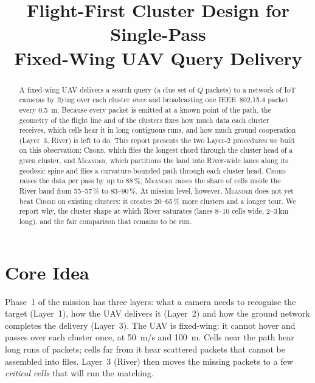 \documentclass[conference]{IEEEtran}
\begin{document}
\title{Flight-First Cluster Design for Single-Pass\\Fixed-Wing UAV Query Delivery}
\author{
}
\maketitle

\begin{abstract}
A fixed-wing UAV delivers a search query (a clue set of $Q$ packets) to a network of IoT cameras by flying over each
cluster \emph{once} and broadcasting one IEEE~802.15.4 packet every \SI{0.5}{m}. Because every packet is emitted at a
known point of the path, the geometry of the flight line and of the clusters fixes how much data each cluster
receives, which cells hear it in long contiguous runs, and how much ground cooperation (Layer~3, River) is left to do.
This report presents the two Layer-2 procedures we built on this observation: \textsc{Chord}, which flies the longest
chord through the cluster head of a given cluster, and \textsc{Meander}, which partitions the land into
River-wide lanes along its geodesic spine and flies a curvature-bounded path through each cluster head. \textsc{Chord}
raises the data per pass by up to 88\,\%; \textsc{Meander} raises the share of cells inside the River band from
55--57\,\% to 83--90\,\%. At mission level, however, \textsc{Meander} does not yet beat \textsc{Chord} on existing
clusters: it creates 20--65\,\% more clusters and a longer tour. We report why, the cluster shape at which River
saturates (lanes 8--10 cells wide, 2--3\,km long), and the fair comparison that remains to be run.
\end{abstract}

\section{Core Idea}
Phase~1 of the mission has three layers: what a camera needs to recognise the target (Layer~1), how the UAV delivers
it (Layer~2) and how the ground network completes the delivery (Layer~3). The UAV is fixed-wing: it cannot hover and
passes over each cluster once, at \SI{50}{m/s} and \SI{100}{m}. Cells near the path hear long runs of packets; cells
far from it hear scattered packets that cannot be assembled into files. Layer~3 (River) then moves the missing
packets to a few \emph{critical cells} that will run the matching.
\end{document}
